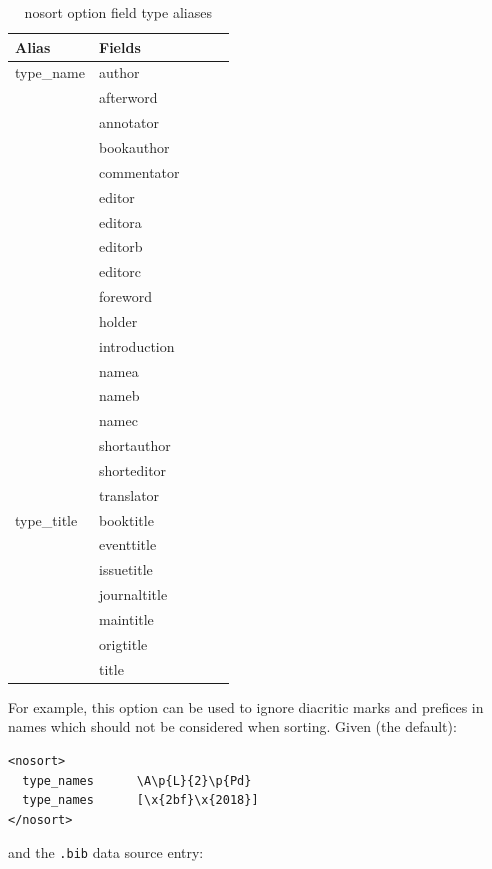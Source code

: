 \documentclass{ltxdockit}
\begin{document}
\begin{table}
\begin{center}
\small
\begin{tabular}{lllll}
\toprule
Alias & Fields\\
\midrule
type\_name & author\\
          & afterword\\
          & annotator\\
          & bookauthor\\
          & commentator\\
          & editor\\
          & editora\\
          & editorb\\
          & editorc\\
          & foreword\\
          & holder\\
          & introduction\\
          & namea\\
          & nameb\\
          & namec\\
          & shortauthor\\
          & shorteditor\\
          & translator\\
type\_title & booktitle\\
           & eventtitle\\
           & issuetitle\\
           & journaltitle\\
           & maintitle\\
           & origtitle\\
           & title\\
\bottomrule
\end{tabular}
\end{center}
\caption{nosort option field type aliases}
\label{tab:nst}
\end{table}

For example, this option can be used to ignore diacritic marks and prefices
in names which should not be considered when sorting. Given (the default):

\begin{verbatim}
<nosort>
  type_names      \A\p{L}{2}\p{Pd}
  type_names      [\x{2bf}\x{2018}]
</nosort>
\end{verbatim}

and the \verb+.bib+ data source entry:
\end{document}
